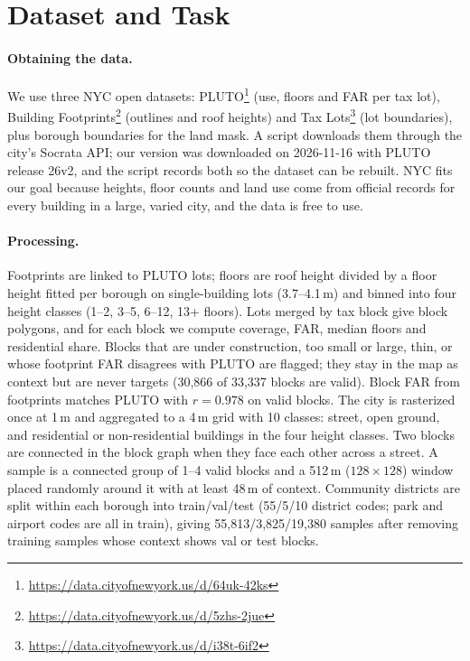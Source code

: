 \documentclass[twocolumn,11pt]{article}
\begin{document}
\section{Dataset and Task}
\paragraph{Obtaining the data.} We use three NYC open datasets: PLUTO\footnote{\url{https://data.cityofnewyork.us/d/64uk-42ks}} (use, floors and FAR per tax lot), Building Footprints\footnote{\url{https://data.cityofnewyork.us/d/5zhs-2jue}} (outlines and roof heights) and Tax Lots\footnote{\url{https://data.cityofnewyork.us/d/i38t-6if2}} (lot boundaries), plus borough boundaries for the land mask. A script downloads them through the city's Socrata API; our version was downloaded on 2026-11-16 with PLUTO release 26v2, and the script records both so the dataset can be rebuilt. NYC fits our goal because heights, floor counts and land use come from official records for every building in a large, varied city, and the data is free to use.

\paragraph{Processing.} Footprints are linked to PLUTO lots; floors are roof height divided by a floor height fitted per borough on single-building lots (3.7--4.1\,m) and binned into four height classes (1--2, 3--5, 6--12, 13+ floors). Lots merged by tax block give block polygons, and for each block we compute coverage, FAR, median floors and residential share. Blocks that are under construction, too small or large, thin, or whose footprint FAR disagrees with PLUTO are flagged; they stay in the map as context but are never targets (30,866 of 33,337 blocks are valid). Block FAR from footprints matches PLUTO with $r=0.978$ on valid blocks. The city is rasterized once at 1\,m and aggregated to a 4\,m grid with 10 classes: street, open ground, and residential or non-residential buildings in the four height classes. Two blocks are connected in the block graph when they face each other across a street. A sample is a connected group of 1--4 valid blocks and a 512\,m ($128\times128$) window placed randomly around it with at least 48\,m of context. Community districts are split within each borough into train/val/test (55/5/10 district codes; park and airport codes are all in train), giving 55,813/3,825/19,380 samples after removing training samples whose context shows val or test blocks.
\end{document}
